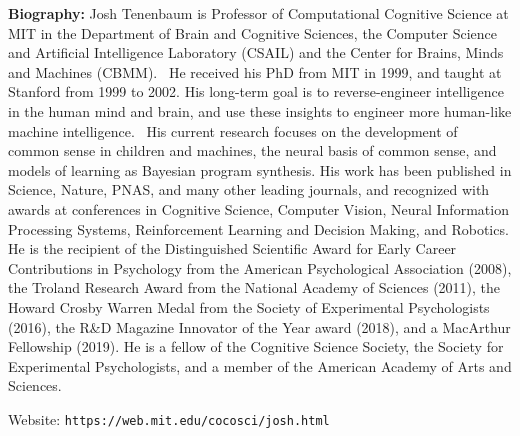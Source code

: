 {\bf Biography:} Josh Tenenbaum is Professor of Computational Cognitive Science at MIT in the Department of Brain and Cognitive Sciences, the Computer Science and Artificial Intelligence Laboratory (CSAIL) and the Center for Brains, Minds and Machines (CBMM).  He received his PhD from MIT in 1999, and taught at Stanford from 1999 to 2002. His long-term goal is to reverse-engineer intelligence in the human mind and brain, and use these insights to engineer more human-like machine intelligence.  His current research focuses on the development of common sense in children and machines, the neural basis of common sense, and models of learning as Bayesian program synthesis. His work has been published in Science, Nature, PNAS, and many other leading journals, and recognized with awards at conferences in Cognitive Science, Computer Vision, Neural Information Processing Systems, Reinforcement Learning and Decision Making, and Robotics. He is the recipient of the Distinguished Scientific Award for Early Career Contributions in Psychology from the American Psychological Association (2008), the Troland Research Award from the National Academy of Sciences (2011), the Howard Crosby Warren Medal from the Society of Experimental Psychologists (2016), the R\&D Magazine Innovator of the Year award (2018), and a MacArthur Fellowship (2019). He is a fellow of the Cognitive Science Society, the Society for Experimental Psychologists, and a member of the American Academy of Arts and Sciences.

Website: {\tt https://web.mit.edu/cocosci/josh.html}

\newpage
